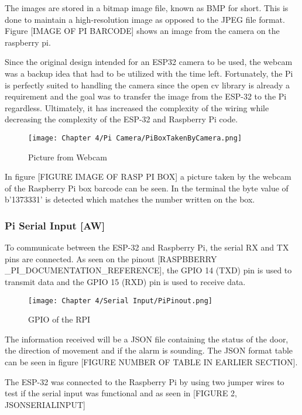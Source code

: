 The images are stored in a bitmap image file, known as BMP for short.
This is done to maintain a high-resolution image as opposed to the JPEG file format.
Figure [IMAGE OF PI BARCODE] shows an image from the camera on the raspberry pi.

Since the original design intended for an ESP32 camera to be used, the webcam was a backup idea that had to be utilized with the time left.
Fortunately, the Pi is perfectly suited to handling the camera since the open cv library is already a requirement and the goal was to transfer the image from the ESP-32 to the Pi regardless.
Ultimately, it has increased the complexity of the wiring while decreasing the complexity of the ESP-32 and Raspberry Pi code.

\begin{figure}[H]        
    \centering
    \texttt{[image: Chapter 4/Pi Camera/PiBoxTakenByCamera.png]}
    \caption{Picture from Webcam}
    \label{fig:webcampic} 
\end{figure} 

In figure [FIGURE IMAGE OF RASP PI BOX] a picture taken by the webcam of the Raspberry Pi box barcode can be seen.
In the terminal the byte value of b'1373331' is detected which matches the number written on the box.

\subsubsection{Pi Serial Input [AW]}

To communicate between the ESP-32 and Raspberry Pi, the serial RX and TX pins are connected.
As seen on the pinout [RASPBBERRY \_PI\_DOCUMENTATION\_REFERENCE], the GPIO 14 (TXD) pin is used to transmit data and the GPIO 15 (RXD) pin is used to receive data.

\begin{figure}[H]        
    \centering
    \texttt{[image: Chapter 4/Serial Input/PiPinout.png]}
    \caption{GPIO of the RPI}
    \label{fig:rpigpio} 
\end{figure} 

The information received will be a JSON file containing the status of the door, the direction of movement and if the alarm is sounding.
The JSON format table can be seen in figure [FIGURE NUMBER OF TABLE IN EARLIER SECTION].

The ESP-32 was connected to the Raspberry Pi by using two jumper wires to test if the serial input was functional and as seen in [FIGURE 2, JSONSERIALINPUT]

